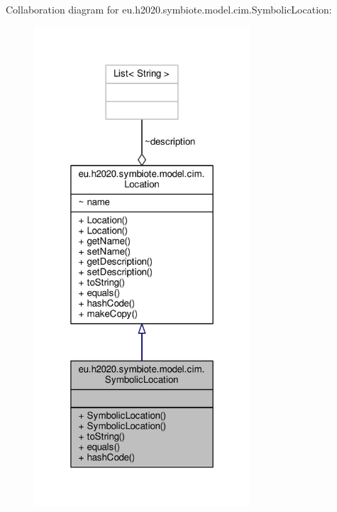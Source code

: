 Collaboration diagram for eu.\+h2020.\+symbiote.\+model.\+cim.\+Symbolic\+Location\+:
\nopagebreak
\begin{figure}[H]
\begin{center}
\leavevmode
\includegraphics[width=228pt]{classeu_1_1h2020_1_1symbiote_1_1model_1_1cim_1_1SymbolicLocation__coll__graph}
\end{center}
\end{figure}
